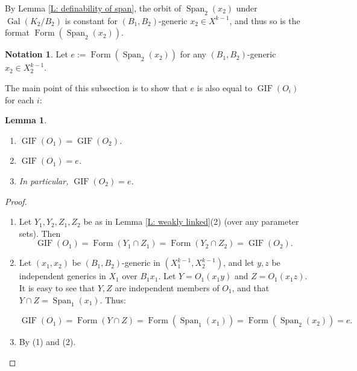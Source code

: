 \documentclass{amsart}
\newtheorem{lemma}[theorem]{Lemma}
\theoremstyle{definition}
\newtheorem{notation}[theorem]{Notation}
\begin{document}
    By Lemma \ref{L: definability of span}, the orbit of $\operatorname{Span}_2(x_2)$ under $\operatorname{Gal}(K_2/B_2)$ is constant for $(B_1,B_2)$-generic $x_2\in X^{k-1}$, and thus so is the format $\operatorname{Form}(\operatorname{Span}_2(x_2))$.

    \begin{notation} Let $e:=\operatorname{Form}(\operatorname{Span}_2(x_2))$ for any $(B_1,B_2)$-generic $x_2\in X_2^{k-1}$.
    \end{notation}


    The main point of this subsection is to show that $e$ is also equal to $\operatorname{GIF}(O_i)$ for each $i$:

    \begin{lemma}\label{L: degree of intersection}
    \begin{enumerate}
        \item $\operatorname{GIF}(O_1)=\operatorname{GIF}(O_2)$.
        \item $\operatorname{GIF}(O_1)=e$.
        \item In particular, $\operatorname{GIF}(O_2)=e$.
    \end{enumerate}
    \end{lemma}
    \begin{proof}
        \begin{enumerate}
            \item Let $Y_1,Y_2,Z_1,Z_2$ be as in Lemma \ref{L: weakly linked}(2) (over any parameter sets). Then $$\operatorname{GIF}(O_1)=\operatorname{Form}(Y_1\cap Z_1)=\operatorname{Form}(Y_2\cap Z_2)=\operatorname{GIF}(O_2).$$
            \item Let $(x_1,x_2)$ be $(B_1,B_2)$-generic in $(X_1^{k-1},X_2^{k-1})$, and let $y,z$ be independent generics in $X_1$ over $B_1x_1$. Let $Y=O_1(x_1y)$ and $Z=O_1(x_1z)$. It is easy to see that $Y,Z$ are independent members of $O_1$, and that $Y\cap Z=\operatorname{Span}_1(x_1)$. Thus:
            
            $$\operatorname{GIF}(O_1)=\operatorname{Form}(Y\cap Z)=\operatorname{Form}(\operatorname{Span}_1(x_1))=\operatorname{Form}(\operatorname{Span}_2(x_2))=e.$$
            \item By (1) and (2).
        \end{enumerate}
    \end{proof}
\end{document}
